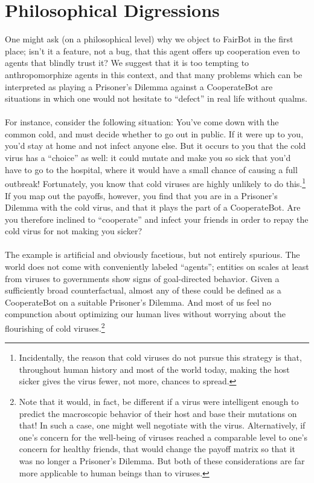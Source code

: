 \documentclass[12pt, letterpaper]{article}
\numberwithin{equation}{section}
\begin{document}
\section{Philosophical Digressions}
\label{PhilosophicalConclusions}

One might ask (on a philosophical level) why we object to FairBot in the first place; isn't it a feature, not a bug, that this agent offers up cooperation even to agents that blindly trust it? We suggest that it is too tempting to anthropomorphize agents in this context, and that many problems which can be interpreted as playing a Prisoner's Dilemma against a CooperateBot are situations in which one would not hesitate to ``defect'' in real life without qualms.\\
\\ 
For instance, consider the following situation: You've come down with the common cold, and must decide whether to go out in public. If it were up to you, you'd stay at home and not infect anyone else. But it occurs to you that the cold virus has a ``choice'' as well: it could mutate and make you so sick that you'd have to go to the hospital, where it would have a small chance of causing a full outbreak! Fortunately, you know that cold viruses are highly unlikely to do this.\footnote{Incidentally, the reason that cold viruses do not pursue this strategy is that, throughout human history and most of the world today, making the host sicker gives the virus fewer, not more, chances to spread.} If you map out the payoffs, however, you find that you are in a Prisoner's Dilemma with the cold virus, and that it plays the part of a CooperateBot. Are you therefore inclined to ``cooperate'' and infect your friends in order to repay the cold virus for not making you sicker?\\
\\
The example is artificial and obviously facetious, but not entirely spurious. The world does not come with conveniently labeled ``agents''; entities on scales at least from viruses to governments show signs of goal-directed behavior. Given a sufficiently broad counterfactual, almost any of these could be defined as a CooperateBot on a suitable Prisoner's Dilemma. And most of us feel no compunction about optimizing our human lives without worrying about the flourishing of cold viruses.\footnote{Note that it would, in fact, be different if a virus were intelligent enough to predict the macroscopic behavior of their host and base their mutations on that! In such a case, one might well negotiate with the virus. Alternatively, if one's concern for the well-being of viruses reached a comparable level to one's concern for healthy friends, that would change the payoff matrix so that it was no longer a Prisoner's Dilemma. But both of these considerations are far more applicable to human beings than to viruses.}\\
\end{document}
